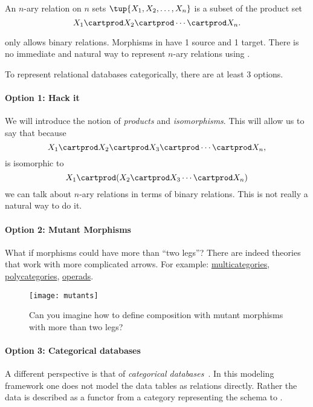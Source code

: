 \begin{definition}
    \label{def:n-ary-relation}
    An $n$-ary relation on $n$ sets $\tup{X_1, X_2, \dots, X_n}$ is a subset of the product set
    \begin{equation*}
        X_1 \cartprod X_2 \cartprod \cdots \cartprod X_n.
    \end{equation*}
\end{definition}

\Rel only allows binary relations.
Morphisms in \Rel have 1 source and 1 target.
There is no immediate and natural way to represent $n$-ary relations using \Rel.

To represent relational databases categorically, there are at least 3 options.

\paragraph{Option 1: Hack it}
We will introduce the notion of \emph{products} and \emph{isomorphisms}.
This will allow us to say that because
\begin{equation*}
    X_1 \cartprod X_2 \cartprod X_3 \cartprod \cdots \cartprod X_n,
\end{equation*}
is isomorphic to
\begin{equation*}
    X_1 \cartprod ( X_2 \cartprod X_3 \cdots \cartprod X_n)
\end{equation*}
we can talk about $n$-ary relations in terms of binary relations.
This is not really a natural way to do it.

\paragraph{Option 2: Mutant Morphisms}
What if morphisms could have more than ``two legs''?
There are indeed theories that work with more complicated arrows.
For example: \href{https://ncatlab.org/nlab/show/multicategory}{multicategories}, \href{https://ncatlab.org/nlab/show/polycategory}{polycategories}, \href{https://ncatlab.org/nlab/show/operad}{operads}.

\begin{figure}[h]
    \centering
    \texttt{[image: mutants]}
    \caption{Can you imagine how to define composition with mutant morphisms with more than two legs?}
\end{figure}

\paragraph{Option 3: Categorical databases}

A different perspective is that of \emph{categorical databases}~\cite{spivak2019categorical}.
In this modeling framework one does not model the data tables as relations directly.
Rather the data is described as a functor from a category representing the schema to \Set.
